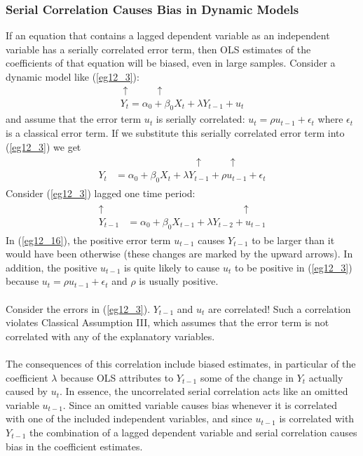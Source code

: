 \documentclass[11pt]{article}
\begin{document}
\subsubsection{Serial Correlation Causes Bias in Dynamic Models}
If an equation that contains a lagged dependent variable as an independent variable has a serially correlated error term, then OLS estimates of the coefficients of that equation will be biased, even in large samples. Consider a dynamic model like (\ref{eg12_3}):
\begin{align*}
\uparrow\>\>\quad\quad\uparrow\>\>\\
Y_t = \alpha_0 + \beta_0X_t + \lambda Y_{t-1} + u_t 
\end{align*}
and assume that the error term $u_t$ is serially correlated: $u_t = \rho u_{t-1} + \epsilon_t$ where $\epsilon_t$ is a classical error term. If we substitute this serially correlated error term into (\ref{eg12_3}) we get
\begin{align}
\label{eg12_15}
\begin{split}
&\quad\quad\quad\quad\quad\quad\quad\quad\uparrow\>\>\quad\quad\uparrow\>\>\\
Y_t &= \alpha_0 + \beta_0X_t + \lambda Y_{t-1} + \rho u_{t-1} + \epsilon_t
\end{split}
\end{align}
Consider (\ref{eg12_3}) lagged one time period:
\begin{align}
\label{eg12_16}
\begin{split}
\uparrow\>\>\>&\quad\quad\quad\quad\quad\quad\quad\quad\quad\quad\>\>\quad\>\>\uparrow\>\\
Y_{t-1} &= \alpha_0 + \beta_0X_{t-1} + \lambda Y_{t-2} +  u_{t-1}
\end{split}
\end{align}
In (\ref{eg12_16}), the positive error term $u_{t-1}$ causes $Y_{t-1}$ to be larger than it would have been otherwise (these changes are marked by the upward arrows). In addition, the positive $u_{t-1}$ is quite likely to cause $u_t$ to be positive in (\ref{eg12_3}) because $u_t = \rho u_{t-1} + \epsilon_t$ and $\rho$ is usually positive. \\ \\
Consider the errors in (\ref{eg12_3}). $Y_{t-1}$ and $u_t$ are correlated! Such a correlation violates Classical Assumption III, which assumes that the error term is not correlated with any of the explanatory variables. \\ \\
The consequences of this correlation include biased estimates, in particular of the coefficient $\lambda$ because OLS attributes to $Y_{t-1}$ some of the change in $Y_t$ actually caused by $u_t$. In essence, the uncorrelated serial correlation acts like an omitted variable $u_{t-1}$. Since an omitted variable causes bias whenever it is correlated with one of the included independent variables, and since $u_{t-1}$ is correlated with $Y_{t-1}$ the combination of a lagged dependent variable and serial correlation causes bias in the coefficient estimates.\\ \\
\end{document}
